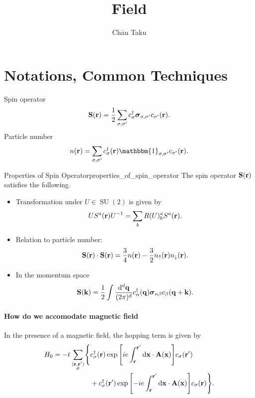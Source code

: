 \documentclass{article}
\title{Field}
\author{Ch\=an Taku}
\begin{document}
\maketitle

\section{Notations, Common Techniques}

Spin operator
\[ \vb{S}(\vb{r}) = \frac{1}{2}\sum_{\sigma,\sigma'} c^\dagger_\sigma \vb*{\sigma}_{\sigma,\sigma'}c_{\sigma'}(\vb{r}). \]
Particle number
\[ n(\vb{r}) = \sum_{\sigma,\sigma'} c^\dagger_\sigma(\vb{r}) \mathbbm{1}_{\sigma,\sigma'} c_{\sigma'}(\vb{r}). \]

\begin{proposition}{Properties of Spin Operator}{properties_of_spin_operator}
    The spin operator $\vb{S}(\vb{r})$ satisfies the following.
    \begin{itemize}
        \item Transformation under $U\in\operatorname{SU}(2)$ is given by
        \[ U S^a(\vb{r}) U^{-1} = \sum_{b} R(U)^a_b S^a(\vb{r}). \]
        \item Relation to particle number:
        \[ \vb{S}(\vb{r})\cdot \vb{S}(\vb{r}) = \frac{3}{4}n(\vb{r}) - \frac{3}{2}n_{\uparrow}(\vb{r})n_{\downarrow}(\vb{r}). \]
        \item In the momentum space
        \[ \vb{S}(\vb{k}) = \frac{1}{2} \int \frac{\dd[d]{\vb{q}}}{(2\pi)^d} c^\dagger_\alpha(\vb{q}) \vb*{\sigma}_{\alpha\beta} c_\beta(\vb{q}+\vb{k}). \]
    \end{itemize}
\end{proposition}

\paragraph*{How do we accomodate magnetic field}
In the presence of a magnetic field, the hopping term is given by
\begin{align*}
    H_0 &= -t \sum_{\substack{\langle \vb{r},\vb{r}'\rangle \\ \sigma}} \Biggl\{
        c^\dagger_\sigma(\vb{r}) \exp\qty[ie \int_{\vb{r}}^{\vb{r}'} \dd{\vb{x}}\cdot \vb{A}(\vb{x})] c_\sigma(\vb{r}') \\
        &\phantom{{}= -t\sum_{\substack{\langle \vb{r},\vb{r}'\rangle \\ \sigma}}\Biggl\{} + c^\dagger_\sigma(\vb{r}') \exp\qty[-ie \int_{\vb{r}}^{\vb{r}'} \dd{\vb{x}}\cdot \vb{A}(\vb{x})] c_\sigma(\vb{r}) \Biggl\}.
\end{align*}
\end{document}
